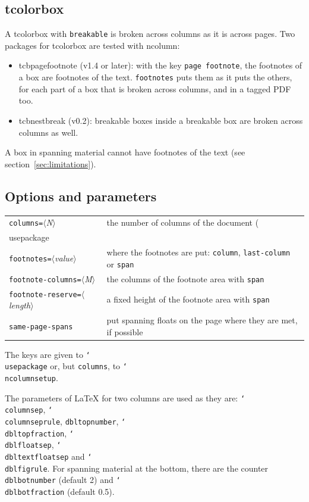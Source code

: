 \documentclass{article}
\newcommand*\cs[1]{\texttt{\char`\\#1}}
\newcommand*\pkg[1]{\textsf{#1}}
\newcommand*\key[1]{\texttt{#1}}
\newcommand*\meta[1]{$\langle$\textit{#1}$\rangle$}
\begin{document}
\subsection{\pkg{tcolorbox}}

A \pkg{tcolorbox} with \key{breakable} is broken across columns as it
is across pages.  Two packages for \pkg{tcolorbox} are tested with
\pkg{ncolumn}:
\begin{itemize}
\item \pkg{tcbpagefootnote} (v1.4 or later): with the key \key{page
  footnote}, the footnotes of a box are footnotes of the text.
  \key{footnotes} puts them as it puts the others, for each part of a
  box that is broken across columns, and in a tagged PDF too.
\item \pkg{tcbnestbreak} (v0.2): breakable boxes inside a breakable
  box are broken across columns as well.
\end{itemize}
A box in spanning material cannot have footnotes of the text (see
section~\ref{sec:limitations}).

\subsection{Options and parameters}

\begin{center}
\begin{tabular}{@{}lp{95mm}@{}}
\hline
\key{columns=}\meta{N} & the number of columns of the document
  (\cs{usepackage} only) \\
\key{footnotes=}\meta{value} & where the footnotes are put:
  \key{column}, \key{last-column} or \key{span} \\
\key{footnote-columns=}\meta{M} & the columns of the footnote area
  with \key{span} \\
\key{footnote-reserve=}\meta{length} & a fixed height of the footnote
  area with \key{span} \\
\key{same-page-spans} & put spanning floats on the page where they are
  met, if possible \\
\hline
\end{tabular}
\end{center}
The keys are given to \cs{usepackage} or, but \key{columns}, to
\cs{ncolumnsetup}.

The parameters of \LaTeX{} for two columns are used as they are:
\cs{columnsep}, \cs{columnseprule}, \texttt{dbltopnumber},
\cs{dbltopfraction}, \cs{dblfloatsep}, \cs{dbltextfloatsep} and
\cs{dblfigrule}.  For spanning material at the bottom, there are the
counter \texttt{dblbotnumber} (default 2) and \cs{dblbotfraction}
(default 0.5).
\end{document}
